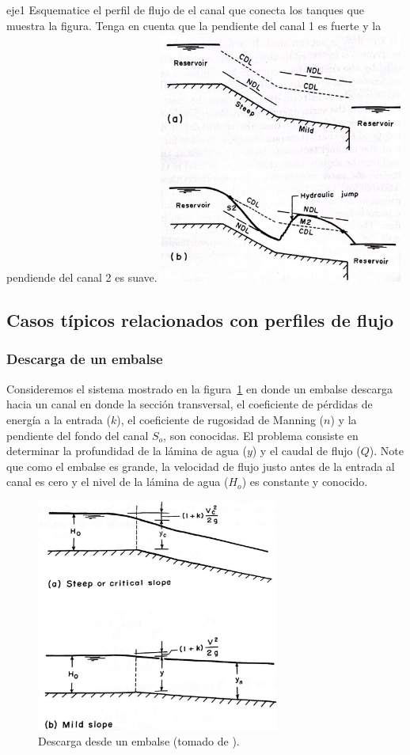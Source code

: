 \documentclass[11pt, oneside]{article}
\begin{document}
\begin{eje}{}{eje1}
Esquematice el perfil de flujo de el canal que conecta los tanques que muestra la figura. Tenga en cuenta que la pendiente del canal 1 es fuerte y la pendiende del canal 2 es suave.
\includegraphics[width=8cm]{fig51e.jpeg}
\end{eje}

\subsection{Casos t\'ipicos relacionados con perfiles de flujo}
\subsubsection*{Descarga de un embalse}
Consideremos el sistema mostrado en la figura~\ref{fig6} en donde un embalse descarga hacia un canal en donde la secci\'on transversal, el coeficiente de p\'erdidas de energ\'ia a la entrada ($k$), el coeficiente de rugosidad de Manning ($n$) y la pendiente del fondo del canal $S_o$, son conocidas. El problema consiste en determinar la profundidad de la l\'amina de agua ($y$) y el caudal de flujo ($Q$). Note que como el embalse es grande, la velocidad de flujo justo antes de la entrada al canal es cero y el nivel de la l\'amina de agua ($H_o$) es constante y conocido.  

\begin{figure}[h]
\centering
\includegraphics[width=8cm]{fig58.jpeg}
\caption{Descarga desde un embalse (tomado de \cite{Chau}).}
\label{fig6}
\end{figure}
\end{document}
